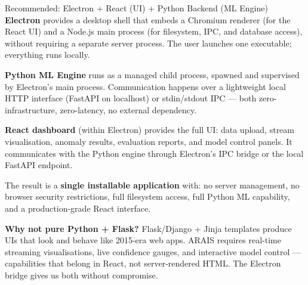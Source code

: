 \documentclass[11pt, a4paper]{article}
\begin{document}
\begin{greenbox}{Recommended: Electron + React (UI) + Python Backend (ML Engine)}
\textbf{Electron} provides a desktop shell that embeds a Chromium renderer 
(for the React UI) and a Node.js main process (for filesystem, IPC, and database access),
without requiring a separate server process.
The user launches one executable; everything runs locally.

\textbf{Python ML Engine} runs as a managed child process,
spawned and supervised by Electron's main process.
Communication happens over a lightweight local HTTP interface (FastAPI on localhost)
or stdin/stdout IPC — both zero-infrastructure, zero-latency, no external dependency.

\textbf{React dashboard} (within Electron) provides the full UI:
data upload, stream visualisation, anomaly results, evaluation reports,
and model control panels. It communicates with the Python engine through
Electron's IPC bridge or the local FastAPI endpoint.

\medskip
\noindent The result is a \textbf{single installable application} with:
no server management, no browser security restrictions, full filesystem access,
full Python ML capability, and a production-grade React interface.
\end{greenbox}

\vspace{6pt}
\begin{notebox}
\noindent\textbf{Why not pure Python + Flask?}\quad
Flask/Django + Jinja templates produce UIs that look and behave like 2015-era web apps.
ARAIS requires real-time streaming visualisations, live confidence gauges, and interactive
model control — capabilities that belong in React, not server-rendered HTML.
The Electron bridge gives us both without compromise.
\end{notebox}
\end{document}
